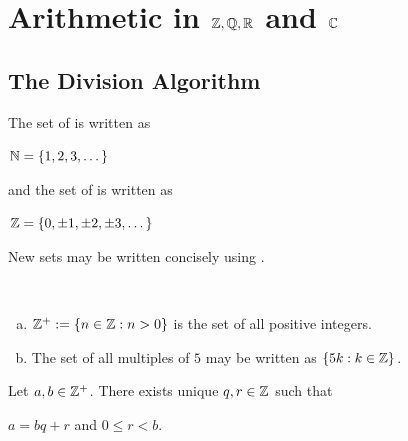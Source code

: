 \documentclass[11pt,fleqn,dvipsnames,usenames]{article}
\renewcommand{\headrulewidth}{1pt}
\newcommand{\p}{\noindent}
\begin{document}
\fancyhead[L]{\course}
\fancyhead[R]{\term}
\renewcommand{\headrulewidth}{0.4pt}


\setcounter{section}{0}
\section{Arithmetic in \texorpdfstring{$\mathbb{Z}, \mathbb{Q}, \mathbb{R}$}{Z, Q, R} and \texorpdfstring{$\mathbb{C}$}{C}}
\setcounter{subsection}{0}
\subsection{The Division Algorithm}

\p The set of  is written as
\begin{center}
$\mathbb{N} = \left\{1,2,3,\dots\right\}$
\end{center}
and the set of  is written as
\begin{center}
\item $\mathbb{Z} = \left\{0, \pm 1, \pm 2,\pm 3,\dots\right\}$
\end{center}
\vsp

\p New sets may be written concisely using .
\vsp

\begin{examples*}~
\begin{enumerate}[(a)]
\item $\mathbb{Z}^{+} := \left\{n\in \mathbb{Z}: n > 0\right\}$ is the set of all positive integers.
\item The set of all multiples of $5$ may be written as $\left\{5k:k\in\mathbb{Z}\right\}$.
\end{enumerate}
\end{examples*}
\vsp

\begin{theorem*} Let $a,b\in\mathbb{Z}^{+}$.  There exists unique $q,r\in\mathbb{Z}$ such that
\begin{center}
$a = bq + r$ and $0\leq r < b$.
\end{center}
\end{theorem*}
%

\begin{example*}~

\vspace{2cm}

\end{example*}
\end{document}
